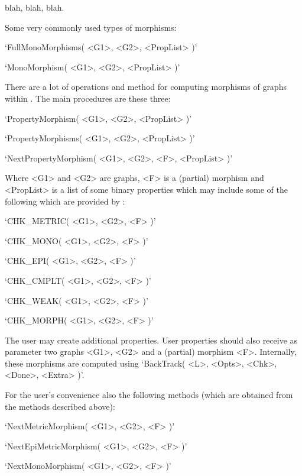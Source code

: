 
blah, blah, blah.


Some very commonly used types of morphisms:

\beginitems
`FullMonoMorphisms( <G1>, <G2>, <PropList> )'

`MonoMorphism( <G1>, <G2>, <PropList> )'
\enditems


There are a lot of operations and method for computing morphisms of graphs within {\YAGS}.
The main procedures are these three:

\beginitems
`PropertyMorphism( <G1>, <G2>, <PropList> )'

`PropertyMorphisms( <G1>, <G2>, <PropList> )'

`NextPropertyMorphism( <G1>, <G2>, <F>, <PropList> )'
\enditems

Where <G1> and <G2> are graphs, <F> is a (partial) morphism and <PropList> is a list 
of some binary properties which may include some of the following which are provided by {\YAGS}: 

\beginitems
`CHK_METRIC( <G1>, <G2>, <F> )'

`CHK_MONO( <G1>, <G2>, <F> )'

`CHK_EPI( <G1>, <G2>, <F> )'

`CHK_CMPLT( <G1>, <G2>, <F> )'

`CHK_WEAK( <G1>, <G2>, <F> )'

`CHK_MORPH( <G1>, <G2>, <F> )'
\enditems



The user may create additional properties. User properties should also receive as 
parameter two graphs <G1>, <G2> and a (partial) morphism <F>. Internally, these morphisms 
are computed using `BackTrack( <L>, <Opts>, <Chk>, <Done>, <Extra> )'.



For the user's convenience also the following methods 
(which are obtained from the methods described above):


\beginitems
`NextMetricMorphism( <G1>, <G2>, <F> )'

`NextEpiMetricMorphism( <G1>, <G2>, <F> )'

`NextMonoMorphism( <G1>, <G2>, <F> )'

